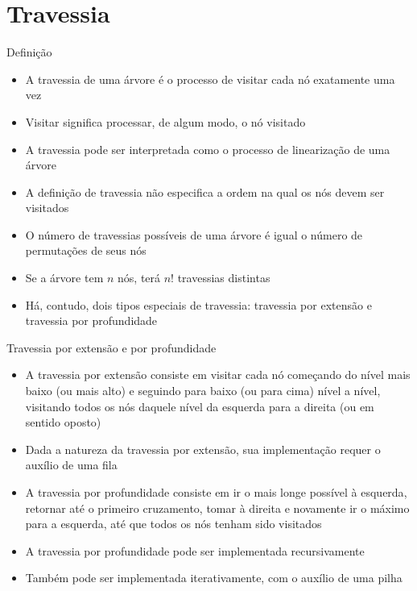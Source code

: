\section{Travessia}

\begin{frame}[fragile]{Definição}
	\begin{itemize}
		\item A {travessia de uma árvore} é o processo de visitar cada 
		nó {exatamente uma} vez

        \item Visitar significa processar, de algum modo, o nó visitado

		\item A travessia pode ser interpretada como o processo de 
		{linearização} de uma árvore

		\item A definição de travessia {não} especifica a {ordem} 
		na qual os nós devem ser visitados

		\item O número de travessias possíveis de uma árvore é igual o número 
		de {permutações} de seus nós 

		\item Se a árvore tem $n$ nós, terá $n!$ travessias distintas

		\item Há, contudo, dois tipos {especiais} de travessia: 
		travessia por {extensão} e travessia por {profundidade}
	\end{itemize} 

\end{frame}
 
\begin{frame}[fragile]{Travessia por extensão e por profundidade}

	\begin{itemize}
		\item {A travessia por {extensão} consiste em visitar cada nó 
		começando do nível mais {baixo} (ou mais alto) e seguindo para 
		{baixo} (ou para cima) nível a nível, visitando {todos} 
		os nós {daquele} nível da esquerda para a direita (ou em sentido 
		oposto)}

        \item Dada a natureza da travessia por extensão, sua implementação requer 
            o auxílio de uma fila

        \item {A travessia por {profundidade} consiste em ir o mais longe 
        possível à {esquerda}, retornar até o primeiro cruzamento, tomar à 
        {direita} e novamente ir o máximo para a {esquerda}, até que 
        todos os nós tenham sido visitados} 

        \item A travessia por profundidade pode ser implementada recursivamente

        \item Também pode ser implementada iterativamente, com o auxílio de uma pilha
	\end{itemize}

\end{frame}

